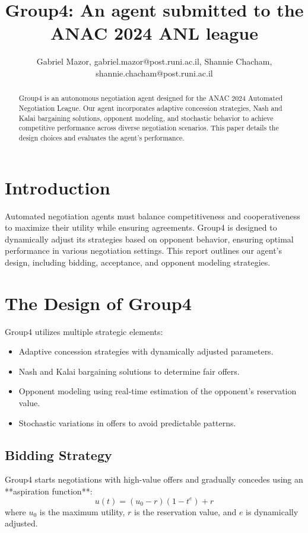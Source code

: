 \documentclass{article}
\title{Group4: An agent submitted to the ANAC 2024 ANL league}
\author{Gabriel Mazor, gabriel.mazor@post.runi.ac.il, Shannie Chacham, shannie.chacham@post.runi.ac.il}
\begin{document}
\maketitle

\begin{abstract}
Group4 is an autonomous negotiation agent designed for the ANAC 2024 Automated Negotiation League. Our agent incorporates adaptive concession strategies, Nash and Kalai bargaining solutions, opponent modeling, and stochastic behavior to achieve competitive performance across diverse negotiation scenarios. This paper details the design choices and evaluates the agent’s performance.
\end{abstract}

\section{Introduction}
Automated negotiation agents must balance competitiveness and cooperativeness to maximize their utility while ensuring agreements. Group4 is designed to dynamically adjust its strategies based on opponent behavior, ensuring optimal performance in various negotiation settings. This report outlines our agent’s design, including bidding, acceptance, and opponent modeling strategies.

\section{The Design of Group4}
Group4 utilizes multiple strategic elements:
\begin{itemize}
    \item Adaptive concession strategies with dynamically adjusted parameters.
    \item Nash and Kalai bargaining solutions to determine fair offers.
    \item Opponent modeling using real-time estimation of the opponent’s reservation value.
    \item Stochastic variations in offers to avoid predictable patterns.
\end{itemize}

\subsection{Bidding Strategy}
Group4 starts negotiations with high-value offers and gradually concedes using an **aspiration function**:
\begin{equation}
    u(t) = (u_0 - r) (1 - t^e) + r
\end{equation}
where $u_0$ is the maximum utility, $r$ is the reservation value, and $e$ is dynamically adjusted.
\end{document}
